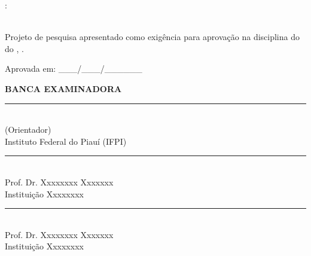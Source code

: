 \newpage
\thispagestyle{empty}
\begin{center}
    \MakeUppercase{\aluno}
    
    \vspace{2.5cm}
    
    \MakeUppercase{\textbf{\titulo}:}\\
    \vspace{0.3cm}
    {\normalsize \subtitulo}\\
    
    \vspace{2cm}
    
    \begin{flushright}
        \begin{minipage}{8cm}
            \singlespacing
            Projeto de pesquisa apresentado como exigência para aprovação na disciplina \disciplina do \curso do \instituicao, \campus.
        \end{minipage}
    \end{flushright}
    
    \vspace{1cm}
    
    Aprovada em: \_\_\_/\_\_\_/\_\_\_\_\_\_
    
    \vspace{1.5cm}
    
    \textbf{BANCA EXAMINADORA}
    
    \vspace{1cm}
    
    \rule{10cm}{0.4pt}\\
    \orientador (Orientador) \\
    Instituto Federal do Piauí (IFPI)
    
    \vspace{1cm}
    
    \rule{10cm}{0.4pt}\\
    Prof. Dr. Xxxxxxxx Xxxxxxx \\
    Instituição Xxxxxxxx
    
    \vspace{1cm}
    
    \rule{10cm}{0.4pt}\\
    Prof. Dr. Xxxxxxxx Xxxxxxx \\
    Instituição Xxxxxxxx
    
    \vfill
\end{center}